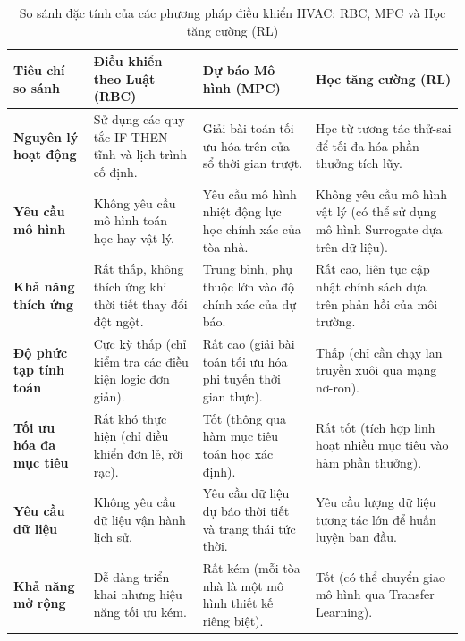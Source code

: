 \documentclass[12pt, a4paper]{report}
\begin{document}
\begin{table}[H]
    \centering
    \caption{So sánh đặc tính của các phương pháp điều khiển HVAC: RBC, MPC và Học tăng cường (RL)}
    \label{tab:control_comparison}
    \small
    \begin{tabularx}{\textwidth}{l >{\raggedright\arraybackslash}X >{\raggedright\arraybackslash}X >{\raggedright\arraybackslash}X}
        \toprule
        \textbf{Tiêu chí so sánh} & \textbf{Điều khiển theo Luật (RBC)} & \textbf{Dự báo Mô hình (MPC)} & \textbf{Học tăng cường (RL)} \\
        \midrule
        \textbf{Nguyên lý hoạt động} & Sử dụng các quy tắc IF-THEN tĩnh và lịch trình cố định. & Giải bài toán tối ưu hóa trên cửa sổ thời gian trượt. & Học từ tương tác thử-sai để tối đa hóa phần thưởng tích lũy. \\
        \textbf{Yêu cầu mô hình} & Không yêu cầu mô hình toán học hay vật lý. & Yêu cầu mô hình nhiệt động lực học chính xác của tòa nhà. & Không yêu cầu mô hình vật lý (có thể sử dụng mô hình Surrogate dựa trên dữ liệu). \\
        \textbf{Khả năng thích ứng} & Rất thấp, không thích ứng khi thời tiết thay đổi đột ngột. & Trung bình, phụ thuộc lớn vào độ chính xác của dự báo. & Rất cao, liên tục cập nhật chính sách dựa trên phản hồi của môi trường. \\
        \textbf{Độ phức tạp tính toán} & Cực kỳ thấp (chỉ kiểm tra các điều kiện logic đơn giản). & Rất cao (giải bài toán tối ưu hóa phi tuyến thời gian thực). & Thấp (chỉ cần chạy lan truyền xuôi qua mạng nơ-ron). \\
        \textbf{Tối ưu hóa đa mục tiêu} & Rất khó thực hiện (chỉ điều khiển đơn lẻ, rời rạc). & Tốt (thông qua hàm mục tiêu toán học xác định). & Rất tốt (tích hợp linh hoạt nhiều mục tiêu vào hàm phần thưởng). \\
        \textbf{Yêu cầu dữ liệu} & Không yêu cầu dữ liệu vận hành lịch sử. & Yêu cầu dữ liệu dự báo thời tiết và trạng thái tức thời. & Yêu cầu lượng dữ liệu tương tác lớn để huấn luyện ban đầu. \\
        \textbf{Khả năng mở rộng} & Dễ dàng triển khai nhưng hiệu năng tối ưu kém. & Rất kém (mỗi tòa nhà là một mô hình thiết kế riêng biệt). & Tốt (có thể chuyển giao mô hình qua Transfer Learning). \\
        \bottomrule
    \end{tabularx}
\end{table}
\end{document}
